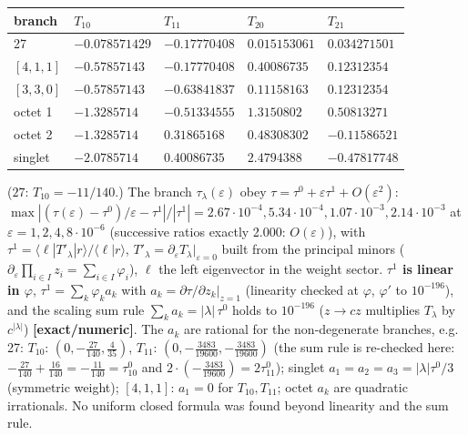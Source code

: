 \documentclass[10pt]{article}
\begin{document}
\begin{center}\small\setlength{\tabcolsep}{3pt}\begin{longtable}{@{}lllll@{}}\toprule
\textbf{branch} & \textbf{$T_{10}$} & \textbf{$T_{11}$} & \textbf{$T_{20}$} & \textbf{$T_{21}$} \\\midrule\endhead
27 & $-0.078571429$ & $-0.17770408$ & $0.015153061$ & $0.034271501$ \\
$[4,1,1]$ & $-0.57857143$ & $-0.17770408$ & $0.40086735$ & $0.12312354$ \\
$[3,3,0]$ & $-0.57857143$ & $-0.63841837$ & $0.11158163$ & $0.12312354$ \\
octet 1 & $-1.3285714$ & $-0.51334555$ & $1.3150802$ & $0.50813271$ \\
octet 2 & $-1.3285714$ & $0.31865168$ & $0.48308302$ & $-0.11586521$ \\
singlet & $-2.0785714$ & $0.40086735$ & $2.4794388$ & $-0.47817748$ \\
\bottomrule\end{longtable}\end{center}

($27$: $T_{10}=-11/140$.) The branch $\tau_\lambda(\varepsilon)$ obey $\tau=\tau^0+\varepsilon\tau^1+O(\varepsilon^2)$: $\max|(\tau(\varepsilon)-\tau^0)/\varepsilon-\tau^1|/|\tau^1|=2.67\cdot10^{-4},5.34\cdot10^{-4},1.07\cdot10^{-3},2.14\cdot10^{-3}$ at $\varepsilon=1,2,4,8\cdot10^{-6}$ (successive ratios exactly 2.000: $O(\varepsilon)$), with $\tau^1=\langle\ell|T'_\lambda|r\rangle/\langle\ell|r\rangle$, $T'_\lambda=\partial_\varepsilon T_\lambda|_{\varepsilon=0}$ built from the principal minors ($\partial_\varepsilon\prod_{i\in I}z_i=\sum_{i\in I}\varphi_i$), $\ell$ the left eigenvector in the weight sector. \textbf{$\tau^1$ is linear in $\varphi$}, $\tau^1=\sum_k\varphi_ka_k$ with $a_k=\partial\tau/\partial z_k|_{z=1}$ (linearity checked at $\varphi$, $\varphi'$ to $10^{-196}$), and the scaling sum rule $\sum_ka_k=|\lambda|\,\tau^0$ holds to $10^{-196}$ ($z\to cz$ multiplies $T_\lambda$ by $c^{|\lambda|}$) \textbf{[exact/numeric]}. The $a_k$ are rational for the non-degenerate branches, e.g. 27: $T_{10}$: $(0,-\frac{27}{140},\frac4{35})$, $T_{11}$: $(0,-\frac{3483}{19600},-\frac{3483}{19600})$ (the sum rule is re-checked here: $-\frac{27}{140}+\frac{16}{140}=-\frac{11}{140}=\tau^0_{10}$ and $2\cdot(-\frac{3483}{19600})=2\tau^0_{11}$); singlet $a_1=a_2=a_3=|\lambda|\tau^0/3$ (symmetric weight); $[4,1,1]$: $a_1=0$ for $T_{10},T_{11}$; octet $a_k$ are quadratic irrationals. No uniform closed formula was found beyond linearity and the sum rule.
\end{document}
